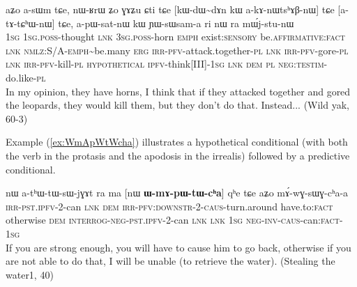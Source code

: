 \documentclass[oldfontcommands,oneside,a4paper,11pt]{article}
\newcommand{\ipa}[1]{{\phon \mbox{#1}}} %
\newcommand{\refb}[1]{(\ref{#1})}
\begin{document}
\begin{exe}
\ex \label{ex:akAnWtshABnW}
\gll 
 \ipa{aʑo}  	\ipa{a-sɯm}  	\ipa{tɕe,}  	\ipa{nɯ-ʁrɯ}  	\ipa{ʑo}  	\ipa{ɣɤʑu}  	\ipa{ɕti}  	\ipa{tɕe}  [\ipa{kɯ-dɯ\textasciitilde{}dɤn}  	\ipa{kɯ}  \ipa{a-kɤ-nɯtsʰɤβ-nɯ}]  	\ipa{tɕe}  	[\ipa{a-tɤ-tɕʰɯ-nɯ}]  	\ipa{tɕe,}  \ipa{a-pɯ-sat-nɯ}  	\ipa{kɯ}  	\ipa{ɲɯ-sɯsam-a}  \ipa{ri} \ipa{nɯ} \ipa{ra}  	\ipa{mɯ́j-stu-nɯ}  \\
 \textsc{1sg} \textsc{1sg.poss}-thought \textsc{lnk} \textsc{3sg.poss}-horn \textsc{emph} exist:\textsc{sensory} be.\textsc{affirmative}:\textsc{fact} \textsc{lnk} \textsc{nmlz}:S/A-\textsc{emph}\textasciitilde{}be.many \textsc{erg} \textsc{irr-pfv}-attack.together-\textsc{pl} \textsc{lnk}  \textsc{irr-pfv}-gore-\textsc{pl} \textsc{lnk}  \textsc{irr-pfv}-kill-\textsc{pl} \textsc{hypothetical} \textsc{ipfv}-think[III]-\textsc{1sg} \textsc{lnk} \textsc{dem} \textsc{pl} \textsc{neg:testim}-do.like-\textsc{pl} \\
\glt In my opinion, they have horns, I think that if they attacked together and gored the leopards, they would kill them, but they don't do that. Instead... (Wild yak, 60-3)
\end{exe} 

Example  \refb{ex:WmApWtWcha} illustrates a hypothetical conditional  (with both the verb in the protasis and the apodosis in the irrealis) followed by a predictive conditional.

\begin{exe}
\ex \label{ex:WmApWtWcha}
\gll 
[\textbf{\ipa{a-pɯ-tɯ-cʰa}}]  	\ipa{nɤ,}  	\ipa{nɯ}  	\ipa{a-tʰɯ-tɯ-sɯ-jɣɤt}  	\ipa{ra}  	\ipa{ma}  	[\ipa{nɯ}  	\textbf{\ipa{ɯ-mɤ-pɯ-tɯ-cʰa}}]  	\ipa{qʰe}  	\ipa{tɕe}  	\ipa{aʑo}  	\ipa{mɤ́-wɣ-sɯɣ-cʰa-a}  	  \\
\textsc{irr-pst.ipfv-2}-can \textsc{lnk} \textsc{dem} \textsc{irr-pfv:downstr-2-caus}-turn.around have.to:\textsc{fact} otherwise
\textsc{dem}  \textsc{interrog-neg-pst.ipfv}-2-can \textsc{lnk} \textsc{lnk} \textsc{1sg} \textsc{neg-inv-caus}-can:\textsc{fact}-\textsc{1sg} \\
\glt If you are strong enough, you will have to cause him to go back, otherwise if you are not able to do that, I will be unable (to retrieve the water). (Stealing the water1, 40)
\end{exe} 
\end{document}
